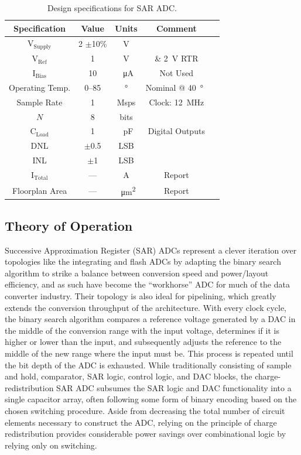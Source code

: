 \documentclass[11pt,letterpaper]{article}
\begin{document}
\begin{table}[ht]
    \centering
    \begin{tabular}{ccccc}
    \toprule
        \textbf{Specification} & \textbf{Value} & \textbf{Units} & \textbf{Comment} \\
    \midrule
        \(\mathrm{V_{Supply}}\) & 2 \(\pm\)10\% & V & \\
        \(\mathrm{V_{Ref}}\) & 1 & V & \& \qty{2}{\V} RTR\\
        \(\mathrm{I_{Bias}}\) & 10 & \qty{}{\uA} & Not Used \\
        Operating Temp. & \SIrange{0}{85}{} & \qty{}{\degree\C} & Nominal @ \qty{40}{\degree\C} \\
        Sample Rate & 1 & Msps & Clock: \qty{12}{\MHz} \\
        \(N\) & 8 & bits & \\
        \(\mathrm{C_{Load}}\) & 1 & \qty{}{\pF} & Digital Outputs \\
        DNL & \(\pm\)0.5 & LSB & \\
        INL & \(\pm\)1 & LSB & \\
        \(\mathrm{I_{Total}}\) & --- & A & Report \\
        Floorplan Area & --- & \qty{}{\um\squared} & Report \\
    \bottomrule
    \end{tabular}
    \caption{Design specifications for SAR ADC.}\label{tab:design_req}
\end{table}

\subsection{Theory of Operation}

Successive Approximation Register (SAR) ADCs represent a clever iteration over topologies like the integrating and flash ADCs by adapting the binary search algorithm to strike a balance between conversion speed and power/layout efficiency, and as such have become the ``workhorse'' ADC for much of the data converter industry. Their topology is also ideal for pipelining, which greatly extends the conversion throughput of the architecture. With every clock cycle, the binary search algorithm compares a reference voltage generated by a DAC in the middle of the conversion range with the input voltage, determines if it is higher or lower than the input, and subsequently adjusts the reference to the middle of the new range where the input must be. This process is repeated until the bit depth of the ADC is exhausted. While traditionally consisting of sample and hold, comparator, SAR logic, control logic, and DAC blocks, the charge-redistribution SAR ADC subsumes the SAR logic and DAC functionality into a single capacitor array, often following some form of binary encoding based on the chosen switching procedure. Aside from decreasing the total number of circuit elements necessary to construct the ADC, relying on the principle of charge redistribution provides considerable power savings over combinational logic by relying only on switching. 
\end{document}
